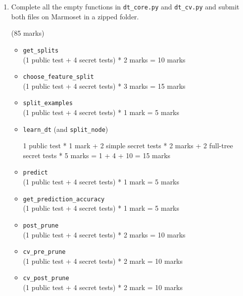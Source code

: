 \documentclass[12pt]{article}
\begin{document}
\begin{enumerate}[font=\Large,label=(\alph*)]
\item 
Complete all the empty functions in \verb+dt_core.py+ and \verb+dt_cv.py+ and submit both files on Marmoset in a zipped folder.

\begin{markscheme}
(85 marks)

\begin{itemize}


\item \verb+get_splits+ \\
(1 public test + 4 secret tests) * 2 marks = 10 marks

\item \verb+choose_feature_split+ \\
(1 public test + 4 secret tests) * 3 marks = 15 marks

\item \verb+split_examples+ \\
(1 public test + 4 secret tests) * 1 mark = 5 marks

\item \verb+learn_dt+ (and \verb+split_node+)

1 public test * 1 mark 
+ 2 simple secret tests * 2 marks 
+ 2 full-tree secret tests * 5 marks 
= 1 + 4 + 10 = 15 marks

\item \verb+predict+ \\
(1 public test + 4 secret tests) * 1 mark = 5 marks

\item \verb+get_prediction_accuracy+ \\
(1 public test + 4 secret tests) * 1 mark = 5 marks

\item \verb+post_prune+ \\
(1 public test + 4 secret tests) * 2 marks = 10 marks

\item \verb+cv_pre_prune+ \\
(1 public test + 4 secret tests) * 2 mark = 10 marks 

\item \verb+cv_post_prune+ \\
(1 public test + 4 secret tests) * 2 mark = 10 marks

\end{itemize}


\end{markscheme}
\end{enumerate}
\end{document}
